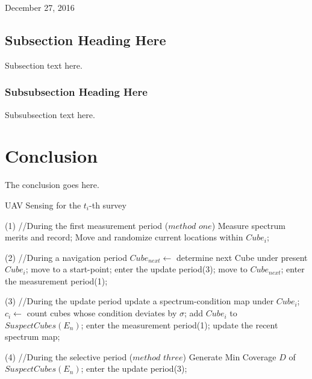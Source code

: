\documentclass[twocolumn,twoside]{IEEEtran}                 %
\begin{document}
\hfill December 27, 2016


\subsection{Subsection Heading Here}
Subsection text here.


\subsubsection{Subsubsection Heading Here}
Subsubsection text here.



\section{Conclusion}
The conclusion goes here.

\begin{algorithm}[h]
\caption{UAV Sensing for the $t_{i}$-th survey}
\begin{algorithmic}[1]
\STATE (1) //During the first measurement period ($method$ $one$)
\STATE Measure spectrum merits and record;
\STATE Move and randomize current locations within $Cube_{i}$;
\ENDFOR

\STATE
\STATE (2) //During a navigation period
\STATE $Cube_{next}\gets $ determine next Cube under present $Cube_{i}$;
\STATE move to a start-point;
\STATE enter the update period(3);
\ELSE
\STATE move to $Cube_{next}$;
\STATE enter the measurement period(1);
\ENDIF

\STATE
\STATE (3) //During the update period
\STATE update a spectrum-condition map under $Cube_{i}$;
\STATE $c_{i}\gets $ count cubes whose condition deviates by $\sigma$;
\STATE add $Cube_{i}$ to $SuspectCubes(E_{n})$;
\STATE enter the measurement period(1);
\ENDFOR
\STATE update the recent spectrum map;
\ENDIF

\STATE
\STATE (4) //During the selective period ($method$ $three$)
\STATE Generate Min Coverage $D$ of $SuspectCubes(E_{n})$;
\ENDFOR
{}
\STATE enter the update period(3);
\ENDIF
\ENDFOR

\end{algorithmic}
\end{algorithm}
\end{document}
